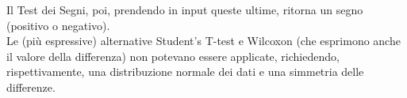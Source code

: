 


%
%
%
%
%
%



Il Test dei Segni, poi, prendendo in input queste ultime, ritorna un segno
(positivo o negativo).\\
Le (più espressive) alternative Student's T-test e Wilcoxon (che esprimono anche
il valore della differenza) non potevano essere applicate, richiedendo,
rispettivamente, una distribuzione normale dei dati e una simmetria delle
differenze.